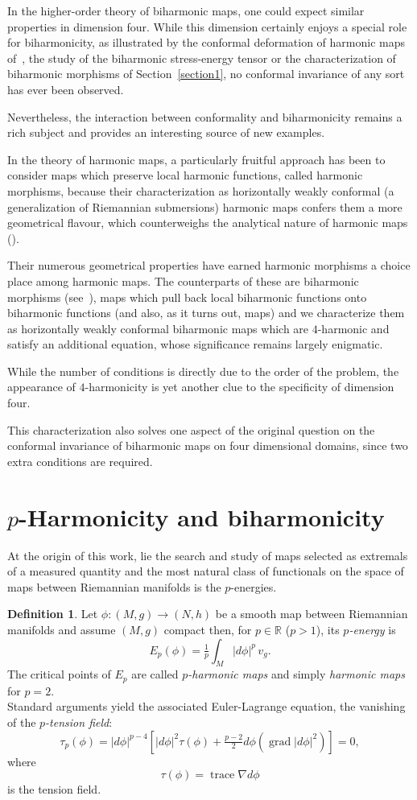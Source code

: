 \documentclass[12pt]{amsart}
\theoremstyle{plain}
\theoremstyle{definition}
\newtheorem{de}{Definition}
\begin{document}
In the higher-order theory of biharmonic maps, one could expect similar properties in
dimension four. While this dimension certainly enjoys a special role for
biharmonicity, as illustrated by the conformal deformation of harmonic maps
of~\cite{B-K}, the study of the biharmonic stress-energy tensor or the
characterization of biharmonic morphisms of Section~\ref{section1}, no conformal
invariance of any sort has ever been observed.

Nevertheless, the interaction between conformality and biharmonicity remains a rich
subject and provides an interesting source of new examples.

In the theory of harmonic maps, a particularly fruitful approach has been to consider
maps which preserve local harmonic functions, called harmonic morphisms, because
their characterization as horizontally weakly conformal (a generalization of
Riemannian submersions) harmonic maps confers them a more geometrical flavour, which
counterweighs the analytical nature of harmonic maps (\cite{Fug,Ish}).

Their numerous geometrical properties have earned harmonic morphisms a choice place
among harmonic maps. The counterparts of these are biharmonic morphisms (see~\cite{OuB}),
 maps which pull back local biharmonic functions onto biharmonic
functions (and also, as it turns out, maps) and we characterize them as horizontally
weakly conformal biharmonic maps which are $4$-harmonic and satisfy an additional
equation, whose significance remains largely enigmatic.

While the number of conditions is directly due to the order of the problem, the
appearance of $4$-harmonicity is yet another clue to the specificity of dimension
four.

This characterization also solves one aspect of the original question on the
conformal invariance of biharmonic maps on four dimensional domains, since two extra
conditions are required.

\section{$p$-Harmonicity and biharmonicity}

At the origin of this work, lie the search and study of maps selected as extremals of
a measured quantity and the most natural class of functionals on the space of maps
between Riemannian manifolds is the $p$-energies.
\begin{de}
Let $\phi : (M,g) \to (N,h)$ be a smooth map between Riemannian manifolds and assume
$(M,g)$ compact then, for $p\in {{\mathbb R}}$ ($p>1$), its {\em $p$-energy} is
$$ E_{p}(\phi) = \tfrac{1}{p} \int_{M} |d\phi|^p \, v_{g} .$$
The critical points of $E_{p}$ are called {\em $p$-harmonic maps} and simply {\em harmonic maps} for $p=2$.\\
Standard arguments yield the associated Euler-Lagrange equation, the vanishing of the
{\em $p$-tension field}:
$$ \tau_{p}(\phi) = |d\phi|^{p-4} [|d\phi|^{2}\tau(\phi) + \tfrac{p-2}{2} d\phi(\operatorname{grad} |d\phi|^2)] =0  ,$$
where
$$ \tau(\phi) =  \operatorname{trace}{ \nabla d \phi } $$
is the tension field.
\end{de}
\end{document}
